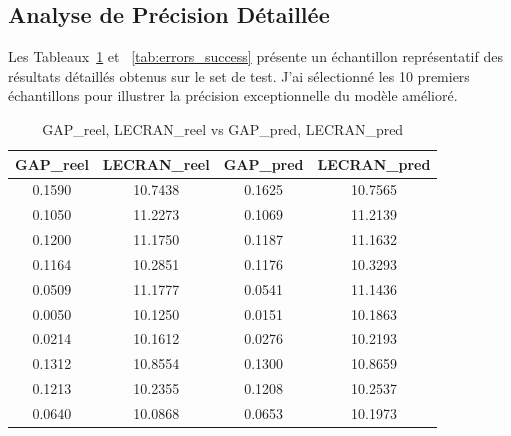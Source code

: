 \documentclass[10pt,twocolumn]{article}
\begin{document}
\subsection{Analyse de Précision Détaillée}

Les Tableaux~\ref{tab:predictions} et ~\ref{tab:errors_success} présente un échantillon représentatif des résultats détaillés obtenus sur le set de test. J'ai sélectionné les 10 premiers échantillons pour illustrer la précision exceptionnelle du modèle amélioré.

\begin{table}[!t]
  \centering
  \scriptsize
  \caption{GAP\_reel, LECRAN\_reel vs GAP\_pred, LECRAN\_pred}
  \label{tab:predictions}
  \begin{tabular}{|c|c|c|c|}
    \hline
    \rowcolor{lightblue}
    \textbf{GAP\_reel} & \textbf{LECRAN\_reel} & \textbf{GAP\_pred} & \textbf{LECRAN\_pred} \\
    \hline
    0.1590 & 10.7438 & 0.1625 & 10.7565 \\
    0.1050 & 11.2273 & 0.1069 & 11.2139 \\
    0.1200 & 11.1750 & 0.1187 & 11.1632 \\
    0.1164 & 10.2851 & 0.1176 & 10.3293 \\
    0.0509 & 11.1777 & 0.0541 & 11.1436 \\
    0.0050 & 10.1250 & 0.0151 & 10.1863 \\
    0.0214 & 10.1612 & 0.0276 & 10.2193 \\
    0.1312 & 10.8554 & 0.1300 & 10.8659 \\
    0.1213 & 10.2355 & 0.1208 & 10.2537 \\
    0.0640 & 10.0868 & 0.0653 & 10.1973 \\
    \hline
  \end{tabular}
\end{table}

\vspace{1em} %
\end{document}
